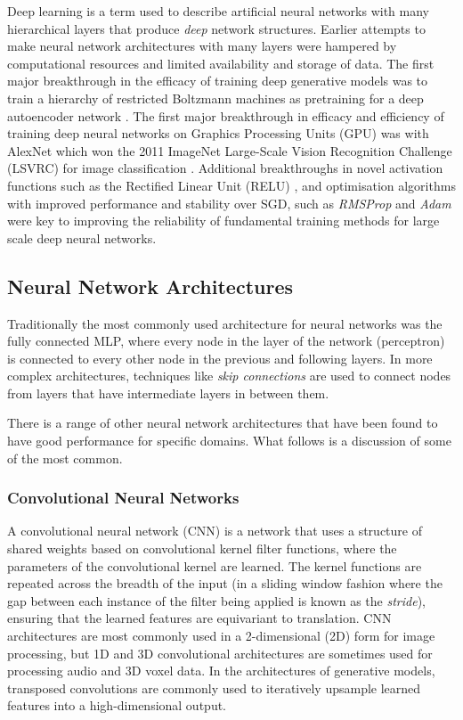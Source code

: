 Deep learning is a term used to describe artificial neural networks with many hierarchical layers that produce \textit{deep} network structures. 
Earlier attempts to make neural network architectures with many layers were hampered by computational resources and limited availability and storage of data. 
The first major breakthrough in the efficacy of training deep generative models was to train a hierarchy of restricted Boltzmann machines \citep{ackley1985learning} as pretraining for a deep autoencoder network \citep{hinton2006reducing}. 
The first major breakthrough in efficacy and efficiency of training deep neural networks on Graphics Processing Units (GPU) was with AlexNet \citep{krizhevsky2012imagenet} which won the 2011 ImageNet Large-Scale Vision Recognition Challenge (LSVRC) for image classification \citep{russakovsky2015imagenet}. 
Additional breakthroughs in novel activation functions such as the Rectified Linear Unit (RELU) \citep{nair2010rectified}, and optimisation algorithms with improved performance and stability over SGD, such as \textit{RMSProp} \citep{tieleman2012lecture} and \textit{Adam} \citep{kingma2015adam} were key to improving the reliability of fundamental training methods for large scale deep neural networks.


\subsection{Neural Network Architectures}

Traditionally the most commonly used architecture for neural networks was the fully connected MLP, where every node in the layer of the network (perceptron) is connected to every other node in the previous and following layers. 
In more complex architectures, techniques like \textit{skip connections} \citep{raiko2012deep,graves2013generating,hermans2013training} are used to connect nodes from layers that have intermediate layers in between them. 

There is a range of other neural network architectures that have been found to have good performance for specific domains. 
What follows is a discussion of some of the most common.

\subsubsection{Convolutional Neural Networks}

A convolutional neural network (CNN) \citep{fukushima1982neocognitron} is a network that uses a structure of shared weights based on convolutional kernel filter functions, where the parameters of the convolutional kernel are learned. 
The kernel functions are repeated across the breadth of the input (in a sliding window fashion where the gap between each instance of the filter being applied is known as the \textit{stride}), ensuring that the learned features are equivariant to translation. 
CNN architectures are most commonly used in a 2-dimensional (2D) form for image processing, but 1D and 3D convolutional architectures are sometimes used for processing audio and 3D voxel data. 
In the architectures of generative models, transposed convolutions are commonly used to iteratively upsample learned features into a high-dimensional output.

